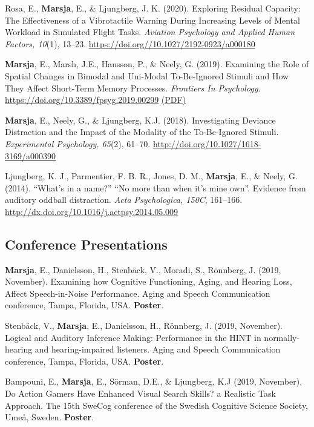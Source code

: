 \documentclass[]{article}
\begin{document}
Rosa, E., \textbf{Marsja}, E., \& Ljungberg, J. K. (2020). Exploring
Residual Capacity: The Effectiveness of a Vibrotactile Warning During
Increasing Levels of Mental Workload in Simulated Flight Tasks.
\emph{Aviation Psychology and Applied Human Factors, 10}(1), 13--23.
\url{https://doi.org//10.1027/2192-0923/a000180}

\textbf{Marsja}, E., Marsh, J.E., Hansson, P., \& Neely, G. (2019).
Examining the Role of Spatial Changes in Bimodal and Uni-Modal
To-Be-Ignored Stimuli and How They Affect Short-Term Memory Processes.
\emph{Frontiers In Psychology}.
\url{https://doi.org/10.3389/fpsyg.2019.00299}
\href{https://bit.ly/3LkKD19}{(PDF)}

\textbf{Marsja}, E., Neely, G., \& Ljungberg, K.J. (2018). Investigating
Deviance Distraction and the Impact of the Modality of the To-Be-Ignored
Stimuli. \emph{Experimental Psychology, 65}(2), 61--70.
\url{http://doi.org/10.1027/1618-3169/a000390}

Ljungberg, K. J., Parmentier, F. B. R., Jones, D. M., \textbf{Marsja},
E., \& Neely, G. (2014). ``What's in a name?'' ``No more than when it's
mine own''. Evidence from auditory oddball distraction. \emph{Acta
Psychologica, 150C}, 161--166.
\href{http://doi.org/10.1027/1618-3169/a000390}{http://dx.doi.org/10.1016/j.actpsy.2014.05.009}

\hypertarget{conference-presentations}{%
\subsection{Conference Presentations}\label{conference-presentations}}

\textbf{Marsja}, E., Danielsson, H., Stenbäck, V., Moradi, S., Rönnberg,
J. (2019, November). Examining how Cognitive Functioning, Aging, and
Hearing Loss, Affect Speech-in-Noise Performance. Aging and Speech
Communication conference, Tampa, Florida, USA. \textbf{Poster}.

Stenbäck, V., \textbf{Marsja}, E., Danielsson, H., Rönnberg, J. (2019,
November). Logical and Auditory Inference Making: Performance in the
HINT in normally-hearing and hearing-impaired listeners. Aging and
Speech Communication conference, Tampa, Florida, USA. \textbf{Poster}.

Bampouni, E., \textbf{Marsja}, E., Sörman, D.E., \& Ljungberg, K.J
(2019, November). Do Action Gamers Have Enhanced Visual Search Skills? a
Realistic Task Approach. The 15th SweCog conference of the Swedish
Cognitive Science Society, Umeå, Sweden. \textbf{Poster}.
\end{document}

